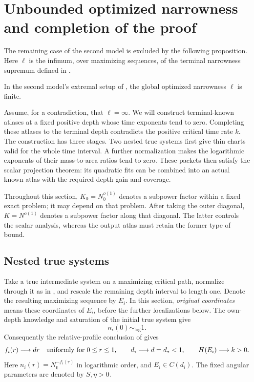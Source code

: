 \section{Unbounded optimized narrowness and completion of the proof}
\label{sec:unbounded-narrowness}

The remaining case of the second model is excluded by the following
proposition. Here \(\ell\) is the infimum, over maximizing sequences,
of the terminal narrowness supremum defined in
.

\begin{proposition}
 \label{prop:unbounded-improvement}
 In the second model's extremal setup of ,
 the global optimized narrowness \(\ell\) is finite.
\end{proposition}

Assume, for a contradiction, that \(\ell=\infty\).
We will construct terminal-known atlases at a fixed positive depth
whose time exponents tend to zero. Completing these atlases to the
terminal depth contradicts the positive critical time rate \(k\).
The construction has three stages. Two nested true systems first
give thin charts valid for the whole time interval. A further
normalization makes the logarithmic exponents of their mass-to-area
ratios tend to zero. These packets then satisfy
the scalar projection theorem: its quadratic fits can be combined
into an actual known atlas with the required depth gain and coverage.

Throughout this section, \(K_0=N_0^{o(1)}\) denotes a subpower factor
within a fixed exact problem; it may depend on that problem.
After taking the outer diagonal, \(K=N^{o(1)}\) denotes a subpower
factor along that diagonal. The latter controls the scalar analysis,
whereas the output atlas must retain the former type of bound.

\subsection{Nested true systems}

Take a true intermediate system on a maximizing critical path,
normalize through it as in , and rescale the
remaining depth interval to length one.
Denote the resulting maximizing sequence by \(E_i\). In this section,
\emph{original coordinates} means these coordinates of \(E_i\), before
the further localizations below. The own-depth knowledge and
saturation of the initial true system give
\[
 n_i(0)\sim_{\log}1.
\]
Consequently the relative-profile conclusion of
 gives
\begin{equation}
 \label{a08:initial-profiles}
 f_i(r)\longrightarrow dr
 \quad\hbox{uniformly for }0\le r\le1,\qquad
 d_i\longrightarrow d=d_*<1,\qquad
 H(E_i)\longrightarrow k>0.
\end{equation}
Here \(n_i(r)=N_0^{-f_i(r)}\) in logarithmic order, and
\(E_i\in C(d_i)\). The fixed angular parameters are denoted by
\(S,\eta>0\).

